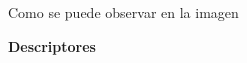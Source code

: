 
\textcolor{Rojo}{Como se puede observar en la imagen}


\textbf{Descriptores}



\renewcommand{\arraystretch}{1.6}

